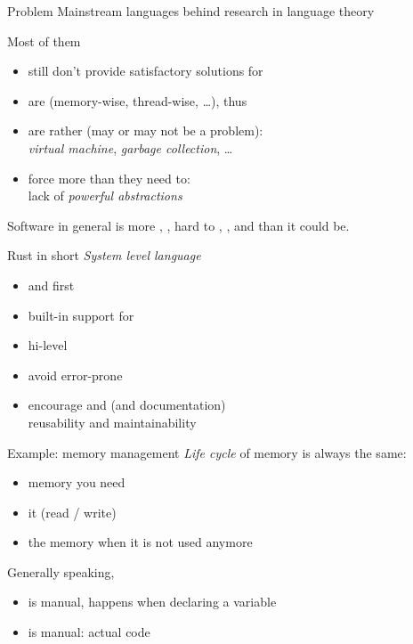 \documentclass[10pt]{beamer}
\begin{document}
\begin{frame}{Problem}
  Mainstream languages  behind research in language theory
  \bigskip

  Most of them
  \begin{itemize}
    \item still don't provide satisfactory solutions for 
    \item are  (memory-wise, thread-wise, \ldots),
      thus 
    \item are rather  (may or may not be a problem):\\
      \emph{virtual machine}, \emph{garbage collection}, \ldots
    \item force more  than they need to:\\
      lack of \emph{powerful abstractions}
  \end{itemize}
  \medskip
  \pause

  Software in general is more , , hard to
  , ,  and  than it
  could be.
\end{frame}




\begin{frame}{Rust in short}
  \emph{System level language}
  \begin{itemize}\bigsep
    \item {} and  first
    \item built-in support for 
    \item hi-level 
    \item avoid error-prone 
    \item encourage  and 
      (and documentation)\\
      \daimpl reusability and maintainability
  \end{itemize}
\end{frame}






\begin{frame}{Example: memory management}
  \emph{Life cycle} of memory is always the same:
  \smallskip
  \begin{itemize}
    \item {} memory you need
    \item {} it (read / write)
    \item {} the memory when it is not used anymore
  \end{itemize}
  \medskip

  Generally speaking,
  \begin{itemize}
    \item {} is manual, happens when declaring a variable
    \item {} is manual: actual code
  \end{itemize}
\end{frame}
\end{document}
